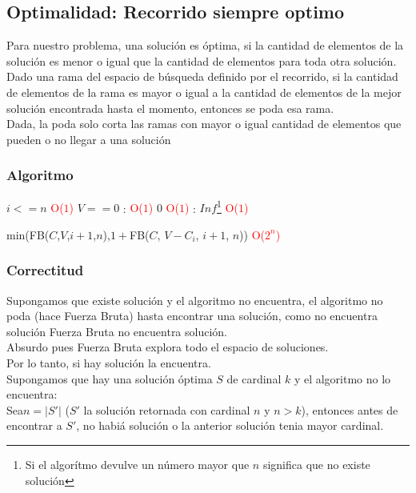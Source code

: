 \subsection{Optimalidad: Recorrido siempre optimo}
Para nuestro problema, una soluci\'on es \'optima, si la cantidad de elementos de la soluci\'on es menor o igual que la cantidad de elementos para toda otra soluci\'on.\\
Dado una rama del espacio de b\'usqueda definido por el recorrido, si la cantidad de elementos de la rama es mayor o igual a la cantidad de elementos de la mejor soluci\'on encontrada hasta el momento, entonces se poda esa rama.\\
Dada, la poda solo corta las ramas con mayor o igual cantidad de elementos que pueden o no llegar a una soluci\'on\\
\subsubsection{Algoritmo}
\begin{codebox}
    \li \If $i <= n$ \quad\quad\quad\quad\quad\quad\quad\textcolor{red}{O($1$)}
        \Then
    \li        \If $V == 0$ : \quad\quad\quad\quad\quad\quad\textcolor{red}{O($1$)}
                \Then
    \li             \Return $0$ \quad\quad\quad\quad\quad\quad\quad\textcolor{red}{O($1$)}
    \li         \Else: 
    \li                 \Return $Inf$\footnote{Si el algor\'itmo devulve un n\'umero mayor que $n$ significa que no existe soluci\'on} \quad\quad\quad\quad\quad\quad\quad\textcolor{red}{O($1$)}
                \End
                \End

    \li \Return min(FB($C$,$V$,$i+1$,$n$),$1 +$FB($C$, $V-C_{i}$, $i+1$, $n$)) \textcolor{red}{O($2^n$)}

    \end{codebox}
\subsubsection{Correctitud}
Supongamos que existe soluci\'on y el algoritmo no encuentra, el algoritmo no poda (hace Fuerza Bruta) hasta encontrar una soluci\'on, como no encuentra soluci\'on Fuerza Bruta no encuentra soluci\'on. \\
Absurdo pues Fuerza Bruta explora todo el espacio de soluciones.\\
Por lo tanto, si hay soluci\'on la encuentra.\\
Supongamos que hay una soluci\'on \'optima $S$ de cardinal $k$ y el algoritmo no lo encuentra:\\
Sea$ n = |S'|$ ($S'$ la soluci\'on retornada con cardinal $n$ y $n > k$), entonces antes de encontrar a $S'$, no habi\'a soluci\'on o la anterior soluci\'on tenia mayor cardinal.\\

